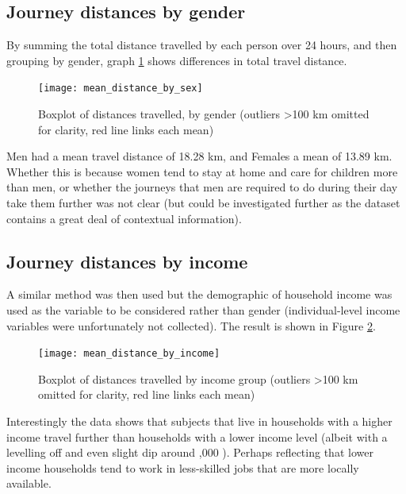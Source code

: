 \subsection{Journey distances by gender}
\label{sec:journey_distances_by_sex}

By summing the total distance travelled by each person over 24 hours, and then grouping by gender, graph \ref{fig:mean_distance_by_sex} shows differences in total travel distance.

\begin{figure}[H]
\centering
\texttt{[image: mean\_distance\_by\_sex]}
\caption{Boxplot of distances travelled, by gender (outliers \textgreater 100 km omitted for clarity, red line links each mean)}
\label{fig:mean_distance_by_sex}
\end{figure}

Men had a mean travel distance of 18.28 km, and Females a mean of 13.89 km. Whether this is because women tend to stay at home and care for children more than men, or whether the journeys that men are required to do during their day take them further was not clear (but could be investigated further as the dataset contains a great deal of contextual information).

\subsection{Journey distances by income}
\label{sec:journey_distances_by_income}

A similar method was then used but the demographic of household income was used as the variable to be considered rather than gender (individual-level income variables were unfortunately not collected). The result is shown in Figure \ref{fig:mean_distance_by_income}.

\begin{figure}[H]
\centering
\texttt{[image: mean\_distance\_by\_income]}
\caption{Boxplot of distances travelled by income group  (outliers \textgreater 100 km omitted for clarity, red line links each mean)}
\label{fig:mean_distance_by_income}
\end{figure}

Interestingly the data shows that subjects that live in households with a higher income travel further than households with a lower income level (albeit with a levelling off and even slight dip around ,000 ). Perhaps reflecting that lower income households tend to work in less-skilled jobs that are more locally available.

